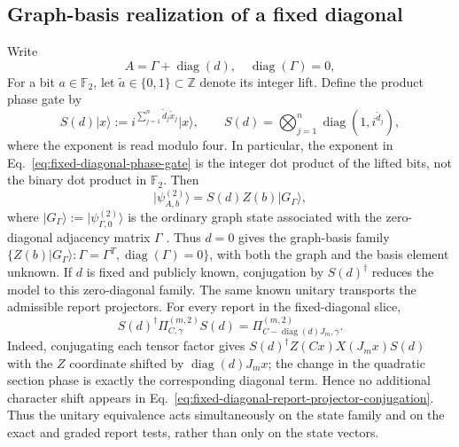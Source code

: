 \documentclass[11pt]{article}
\newcommand{\F}{\mathbb F}
\newcommand{\1}{\mathbf 1}
\newcommand{\ket}[1]{\lvert #1\rangle}
\theoremstyle{plain}
\theoremstyle{definition}
\theoremstyle{remark}
\begin{document}
\subsection{Graph-basis realization of a fixed diagonal}
\label{subsec:fixed-diagonal-graph-basis-submodels}

Write
\begin{equation}
 A=\Gamma+\operatorname{diag}(d),
 \quad \operatorname{diag}(\Gamma)=0,
 \label{eq:fixed-diagonal-decomposition}
\end{equation}
For a bit $a\in\F_2$, let $\widetilde a\in\{0,1\}\subset\mathbb Z$
denote its integer lift.  Define the product phase gate by
\begin{equation}
 S(d)\ket{x}
 :=i^{\sum_{j=1}^n\widetilde d_j\widetilde x_j}\ket{x},
 \qquad
 S(d)=\bigotimes_{j=1}^n\operatorname{diag}(1,i^{\widetilde d_j}),
 \label{eq:fixed-diagonal-phase-gate}
\end{equation}
where the exponent is read modulo four.  In particular, the exponent in
Eq.~\eqref{eq:fixed-diagonal-phase-gate} is the integer dot product of the
lifted bits, not the binary dot product in $\F_2$.
Then
\begin{equation}
 \ket{\psi_{A,b}^{(2)}}=S(d)Z(b)\ket{G_\Gamma},
 \label{eq:fixed-diagonal-graph-basis-decomposition}
\end{equation}
where $\ket{G_\Gamma}:=\ket{\psi_{\Gamma,0}^{(2)}}$ is the ordinary graph
state associated with the zero-diagonal adjacency matrix $\Gamma$
\cite{HeinEtAl2006GraphStates}.  Thus
$d=0$ gives the graph-basis family
$\{Z(b)\ket{G_\Gamma}:\Gamma=\Gamma^T,\operatorname{diag}(\Gamma)=0\}$,
with both the graph and the basis element unknown.  If $d$ is fixed and
publicly known, conjugation by $S(d)^\dagger$ reduces the model to this
zero-diagonal family.
The same known unitary transports the admissible report projectors.  For every
report in the fixed-diagonal slice,
\begin{equation}
 S(d)^\dagger\Pi_{C,\gamma}^{(m,2)}S(d)
 =\Pi_{C-\operatorname{diag}(d)J_m,\gamma}^{(m,2)}.
 \label{eq:fixed-diagonal-report-projector-conjugation}
\end{equation}
Indeed, conjugating each tensor factor gives
$S(d)^\dagger Z(Cx)X(J_mx)S(d)$ with the $Z$ coordinate shifted by
$\operatorname{diag}(d)J_mx$; the change in the quadratic section phase is
exactly the corresponding diagonal term.  Hence no additional character shift
appears in Eq.~\eqref{eq:fixed-diagonal-report-projector-conjugation}.  Thus
the unitary equivalence acts simultaneously on the state family and on the
exact and graded report tests, rather than only on the state vectors.
\end{document}
